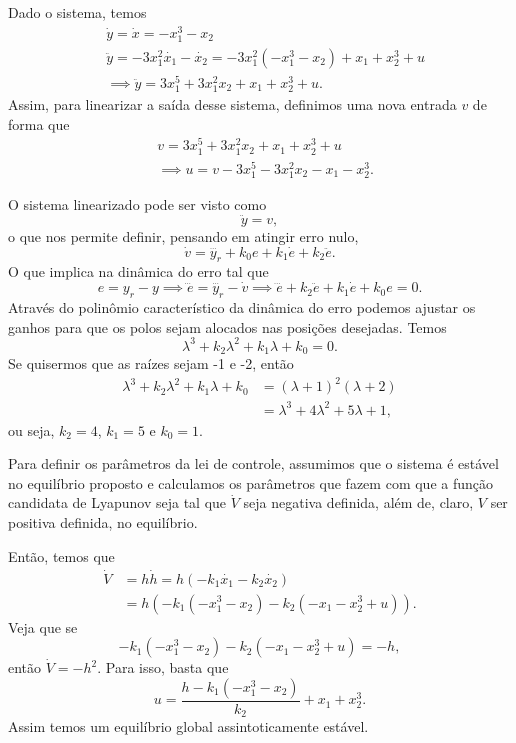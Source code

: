\documentclass[a4paper]{report}
\begin{document}


Dado o sistema, temos
\begin{align*}
    &\dot{y} = \dot{x} = -x_1^3 -x_2 \\
    &\ddot{y} = -3x_1^2 \dot{x_1} -\dot{x_2} = -3x_1^2\left( -x_1^3-x_2 \right) +x_1 +x_2^3 + u \\
    &\implies \ddot{y} = 3x_1^{5} + 3x_1^2x_2 + x_1 + x_2^3 + u
.\end{align*}
Assim, para linearizar a saída desse sistema, definimos uma nova entrada $v$ de forma que
\begin{align*}
    &v = 3x_1^{5} + 3x_1^2x_2 + x_1 + x_2^3 + u \\
    &\implies u = v - 3x_1^{5} - 3x_1^2x_2 - x_1 - x_2^3
.\end{align*}


O sistema linearizado pode ser visto como \[
\ddot{y} = v
,\] o que nos permite definir, pensando em atingir erro nulo, \[
\dot{v} = \dddot{y_r} + k_0e + k_1\dot{e} + k_2 \ddot{e}
.\] O que implica na dinâmica do erro tal que \[
e = y_r - y \implies \dddot{e} = \dddot{y_r} - \dot{v} \implies \dddot{e} + k_2 \ddot{e}+ k_1\dot{e} + k_0e = 0
.\] Através do polinômio característico da dinâmica do erro podemos ajustar os ganhos para que os polos sejam alocados nas posições desejadas. Temos \[
\lambda^3 + k_2\lambda^2 + k_1\lambda + k_0 = 0
.\] Se quisermos que as raízes sejam -1 e -2, então 
\begin{align*}
    \lambda^3 + k_2\lambda^2 + k_1\lambda + k_0 &= \left( \lambda + 1 \right)^2\left( \lambda +2 \right) \\
						&= \lambda^3 + 4\lambda^2 + 5\lambda + 1
,\end{align*}
ou seja, $k_2=4$, $k_1=5$ e $k_0=1$.


Para definir os parâmetros da lei de controle, assumimos que o sistema é estável no equilíbrio proposto e calculamos os parâmetros que fazem com que a função candidata de Lyapunov seja tal que $\dot{V}$ seja negativa definida, além de, claro, $V$ ser positiva definida, no equilíbrio.

Então, temos que 
\begin{align*}
    \dot{V} &= h \dot{h} = h \left( -k_1\dot{x_1} -k_2\dot{x_2} \right) \\
	    &= h \left( -k_1\left( -x_1^3 -x_2 \right) -k_2\left( -x_1-x_2^3+u \right) \right)
.\end{align*}
Veja que se \[
    -k_1\left( -x_1^3 -x_2 \right) -k_2\left( -x_1-x_2^3+u \right) = -h
,\] então $\dot{V} = -h^2$. Para isso, basta que \[
u = \frac{h - k_1\left( -x_1^3 -x_2 \right)}{k_2} + x_1 + x_2^3
.\] Assim temos um equilíbrio global assintoticamente estável.
\end{document}
